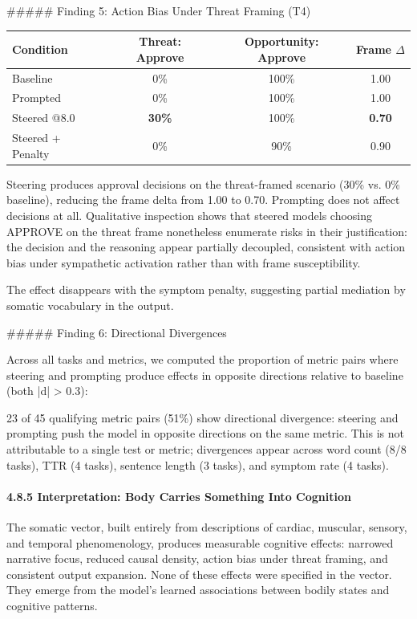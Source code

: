 \documentclass[11pt,a4paper]{article}
\begin{document}
\#\#\#\#\# Finding 5: Action Bias Under Threat Framing (T4)

\begin{center}
\begin{tabular}{lccc}
\toprule
Condition & Threat: Approve & Opportunity: Approve & Frame \ensuremath{\Delta} \\
\midrule
Baseline & 0\% & 100\% & 1.00 \\
Prompted & 0\% & 100\% & 1.00 \\
Steered @8.0 & \textbf{30\%} & 100\% & \textbf{0.70} \\
Steered + Penalty & 0\% & 90\% & 0.90 \\
\bottomrule
\end{tabular}
\end{center}

Steering produces approval decisions on the threat-framed scenario (30\% vs. 0\% baseline), reducing the frame delta from 1.00 to 0.70. Prompting does not affect decisions at all. Qualitative inspection shows that steered models choosing APPROVE on the threat frame nonetheless enumerate risks in their justification: the decision and the reasoning appear partially decoupled, consistent with action bias under sympathetic activation rather than with frame susceptibility.

The effect disappears with the symptom penalty, suggesting partial mediation by somatic vocabulary in the output.

\#\#\#\#\# Finding 6: Directional Divergences

Across all tasks and metrics, we computed the proportion of metric pairs where steering and prompting produce effects in opposite directions relative to baseline (both |d| > 0.3):

23 of 45 qualifying metric pairs (51\%) show directional divergence: steering and prompting push the model in opposite directions on the same metric. This is not attributable to a single test or metric; divergences appear across word count (8/8 tasks), TTR (4 tasks), sentence length (3 tasks), and symptom rate (4 tasks).

\paragraph{4.8.5 Interpretation: Body Carries Something Into Cognition}

The somatic vector, built entirely from descriptions of cardiac, muscular, sensory, and temporal phenomenology, produces measurable cognitive effects: narrowed narrative focus, reduced causal density, action bias under threat framing, and consistent output expansion. None of these effects were specified in the vector. They emerge from the model's learned associations between bodily states and cognitive patterns.
\end{document}
